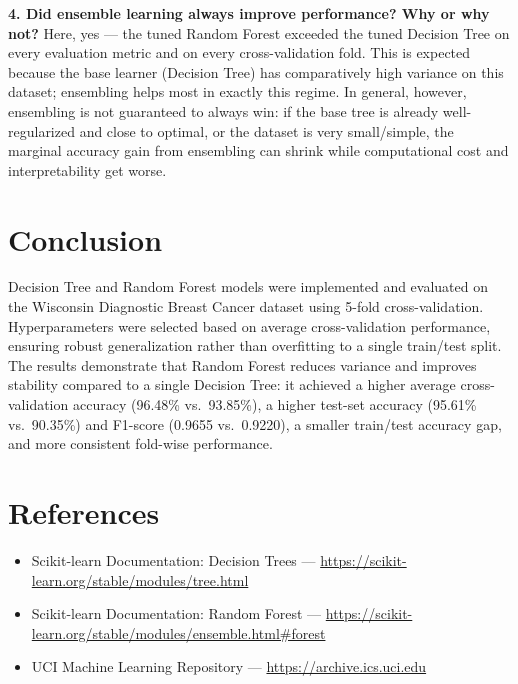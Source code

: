 \documentclass[11pt,a4paper]{article}
\begin{document}
\textbf{4. Did ensemble learning always improve performance? Why or why not?}
Here, yes --- the tuned Random Forest exceeded the tuned Decision Tree on every evaluation metric and
on every cross-validation fold. This is expected because the base learner (Decision Tree) has
comparatively high variance on this dataset; ensembling helps most in exactly this regime. In general,
however, ensembling is not guaranteed to always win: if the base tree is already well-regularized and
close to optimal, or the dataset is very small/simple, the marginal accuracy gain from ensembling can
shrink while computational cost and interpretability get worse.

\section{Conclusion}
Decision Tree and Random Forest models were implemented and evaluated on the Wisconsin Diagnostic
Breast Cancer dataset using 5-fold cross-validation. Hyperparameters were selected based on average
cross-validation performance, ensuring robust generalization rather than overfitting to a single
train/test split. The results demonstrate that Random Forest reduces variance and improves stability
compared to a single Decision Tree: it achieved a higher average cross-validation accuracy (96.48\% vs.\
93.85\%), a higher test-set accuracy (95.61\% vs.\ 90.35\%) and F1-score (0.9655 vs.\ 0.9220), a smaller
train/test accuracy gap, and more consistent fold-wise performance.

\section*{References}
\begin{itemize}
  \item Scikit-learn Documentation: Decision Trees --- \url{https://scikit-learn.org/stable/modules/tree.html}
  \item Scikit-learn Documentation: Random Forest --- \url{https://scikit-learn.org/stable/modules/ensemble.html\#forest}
  \item UCI Machine Learning Repository --- \url{https://archive.ics.uci.edu}
\end{itemize}
\end{document}
